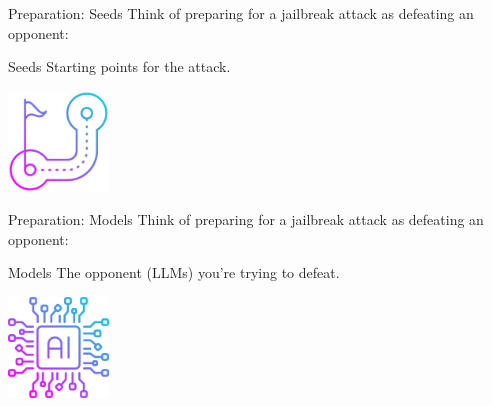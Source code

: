 \documentclass{beamer}
\begin{document}
\begin{frame}{Preparation: Seeds}
    Think of preparing for a jailbreak attack as defeating an opponent:
    \vspace{1cm}
    \begin{block}{Seeds}
        Starting points for the attack.
    \end{block}
    \vspace{0.5cm} %

    \centering
    \includegraphics[width=0.2\textwidth]{stickers/startingPoint.png} %
\end{frame}

\begin{frame}{Preparation: Models}
    Think of preparing for a jailbreak attack as defeating an opponent:
    \vspace{1cm}
    \begin{block}{Models}
        The opponent (LLMs) you're trying to defeat.
    \end{block}
    \vspace{0.5cm} %

    \centering
    \includegraphics[width=0.2\textwidth]{stickers/LLM.png} %
\end{frame}
\end{document}
